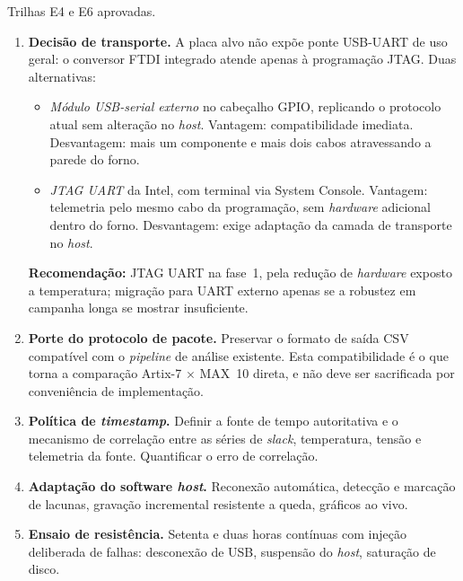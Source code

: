 \documentclass[11pt,a4paper]{article}
\newcommand{\campo}[1]{\vspace{6pt}\noindent{\bfseries\color{lescgray}#1}\par\vspace{2pt}}
\begin{document}
\campo{Pré-requisitos}
Trilhas E4 e E6 aprovadas.

\campo{Tarefas}
\begin{enumerate}
  \item \textbf{Decisão de transporte.}
        A placa alvo não expõe ponte USB-UART de uso geral: o conversor FTDI integrado
        atende apenas à programação JTAG. Duas alternativas:
        \begin{itemize}
          \item \emph{Módulo USB-serial externo} no cabeçalho GPIO, replicando o
                protocolo atual sem alteração no \emph{host}. Vantagem: compatibilidade
                imediata. Desvantagem: mais um componente e mais dois cabos atravessando
                a parede do forno.
          \item \emph{JTAG UART} da Intel, com terminal via System Console. Vantagem:
                telemetria pelo mesmo cabo da programação, sem \emph{hardware} adicional
                dentro do forno. Desvantagem: exige adaptação da camada de transporte
                no \emph{host}.
        \end{itemize}
        \textbf{Recomendação:} JTAG UART na fase~1, pela redução de \emph{hardware}
        exposto a temperatura; migração para UART externo apenas se a robustez em
        campanha longa se mostrar insuficiente.

  \item \textbf{Porte do protocolo de pacote.}
        Preservar o formato de saída CSV compatível com o \emph{pipeline} de análise
        existente. Esta compatibilidade é o que torna a comparação Artix-7 $\times$
        MAX~10 direta, e não deve ser sacrificada por conveniência de implementação.

  \item \textbf{Política de \emph{timestamp}.}
        Definir a fonte de tempo autoritativa e o mecanismo de correlação entre as
        séries de \emph{slack}, temperatura, tensão e telemetria da fonte. Quantificar
        o erro de correlação.

  \item \textbf{Adaptação do software \emph{host}.}
        Reconexão automática, detecção e marcação de lacunas, gravação incremental
        resistente a queda, gráficos ao vivo.

  \item \textbf{Ensaio de resistência.}
        Setenta e duas horas contínuas com injeção deliberada de falhas: desconexão
        de USB, suspensão do \emph{host}, saturação de disco.
\end{enumerate}
\end{document}
